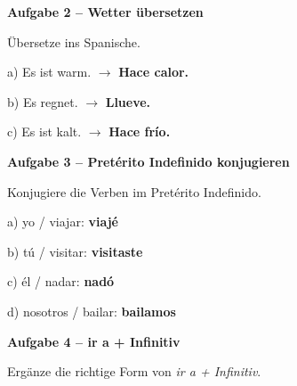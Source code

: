 \documentclass[11pt, a4paper]{article}
\newcommand{\fachfarbe}{spanisch}
\newcommand{\punktebox}[1]{\hfill\fbox{\small \_/#1}}
\newcommand{\lsg}[1]{\textcolor{loesung}{\textbf{#1}}}
\newenvironment{aufgabe}[1]{%
    \needspace{5\baselineskip}%
    \nopagebreak[4]%
    \vspace{10pt}
    \noindent\textbf{\textcolor{\fachfarbe}{Aufgabe #1}}
    \nopagebreak[4]%
    \vspace{5pt}
    \nopagebreak[4]%
    \begin{list}{}{\leftmargin=0pt}
    \item[]
}{%
    \end{list}
}
\begin{document}

\begin{aufgabe}{2 -- Wetter übersetzen}
Übersetze ins Spanische. \punktebox{6}
\end{aufgabe}

\noindent
a) Es ist warm. $\rightarrow$ \lsg{Hace calor.}

\vspace{0.8em}

\noindent
b) Es regnet. $\rightarrow$ \lsg{Llueve.}

\vspace{0.8em}

\noindent
c) Es ist kalt. $\rightarrow$ \lsg{Hace frío.}

\vspace{15pt}


\begin{aufgabe}{3 -- Pretérito Indefinido konjugieren}
Konjugiere die Verben im Pretérito Indefinido. \punktebox{8}
\end{aufgabe}

\noindent
a) yo / viajar: \lsg{viajé}

\vspace{0.8em}

\noindent
b) tú / visitar: \lsg{visitaste}

\vspace{0.8em}

\noindent
c) él / nadar: \lsg{nadó}

\vspace{0.8em}

\noindent
d) nosotros / bailar: \lsg{bailamos}

\vspace{15pt}


\begin{aufgabe}{4 -- ir a + Infinitiv}
Ergänze die richtige Form von \textit{ir a + Infinitiv}. \punktebox{6}
\end{aufgabe}
\end{document}
